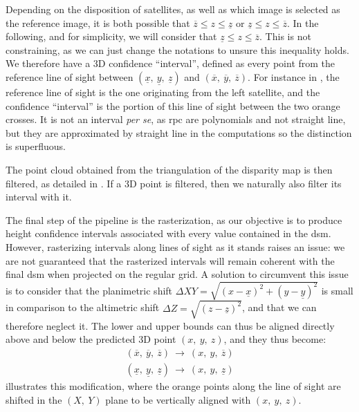 Depending on the disposition of satellites, as well as which image is selected as the reference image, it is both possible that $\overline{z}\leqslant z \leqslant \underline{z}$ or $\underline{z}\leqslant z \leqslant \overline{z}$. In the following, and for simplicity, we will consider that $\underline{z}\leqslant z \leqslant \overline{z}$. This is not constraining, as we can just change the notations to unsure this inequality holds. We therefore have a 3D confidence ``interval'', defined as every point from the reference line of sight between $(\underline{x}, ~\underline{y}, ~\underline{z})$ and $(\overline{x}, ~\overline{y}, ~\overline{z})$. For instance in , the reference line of sight is the one originating from the left satellite, and the confidence ``interval'' is the portion of this line of sight between the two orange crosses. It is not an interval \textit{per se}, as \acrshort{rpc} are polynomials and not straight line, but they are approximated by straight line in the computations so the distinction is superfluous. 

The point cloud obtained from the triangulation of the disparity map is then filtered, as detailed in . If a 3D point is filtered, then we naturally also filter its interval with it. 

The final step of the pipeline is the rasterization, as our objective is to produce height confidence intervals associated with every value contained in the \acrshort{dsm}. However, rasterizing intervals along lines of sight as it stands raises an issue: we are not guaranteed that the rasterized intervals will remain coherent with the final \acrshort{dsm} when projected on the regular grid. A solution to circumvent this issue is to consider that the planimetric shift $\Delta XY=\sqrt{(x-\underline{x})^2+(y-\underline{y})^2}$ is small in comparison to the altimetric shift $\Delta Z=\sqrt{(z-\underline{z})^2}$, and that we can therefore neglect it. The lower and upper bounds can thus be aligned directly above and below the predicted 3D point $(x, ~y, ~z)$, and they thus become:
\begin{align}
    (\overline{x}, ~\overline{y}, ~\overline{z}) ~\rightarrow~ (x, ~y, ~\overline{z})\\
    (\underline{x}, ~\underline{y}, ~\underline{z}) ~\rightarrow~ (x, ~y, ~\underline{z})
\end{align}
 illustrates this modification, where the orange points along the line of sight are shifted in the $(X,~Y)$ plane to be vertically aligned with $(x, ~y, ~z)$. 

